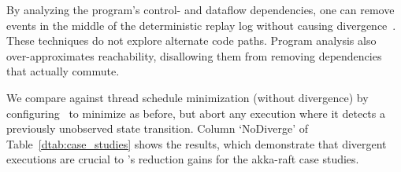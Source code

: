 %
%
%
 By analyzing the program's control- and
dataflow dependencies, one can remove events in the middle of the deterministic
replay log without causing
divergence~\cite{Lee:2011:TGR:1993498.1993528,tallam2007enabling,huang2012lean,cai2013lock,elyasov2013guided,wang2015fast}.
These techniques do not explore alternate code paths. Program analysis also over-approximates
reachability,
disallowing them from removing dependencies that actually commute.

We compare against thread schedule minimization (without divergence) by configuring \sys~to minimize as before, but abort any execution
where it detects a previously unobserved state transition. Column `NoDiverge'
of Table~\ref{dtab:case_studies} shows the results, which demonstrate that
divergent executions are crucial to \sys's reduction gains for the akka-raft case studies.

